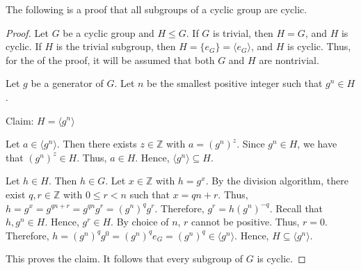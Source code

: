 \documentclass[12pt]{article}
\begin{document}
The following is a proof that all subgroups of a cyclic group are cyclic.

\begin{proof}
Let $G$ be a cyclic group and $H \le G$.  If $G$ is trivial, then $H=G$, and $H$ is cyclic.  If $H$ is the trivial subgroup, then $H=\{e_G\}=\langle e_G \rangle$, and $H$ is cyclic.  Thus, for the  of the proof, it will be assumed that both $G$ and $H$ are nontrivial.

Let $g$ be a generator of $G$.  Let $n$ be the smallest positive integer such that $g^n \in H$.

Claim:  $H=\langle g^n \rangle$

Let $a \in \langle g^n \rangle$.  Then there exists $z \in {\mathbb Z}$ with $a=(g^n)^z$.  Since $g^n \in H$, we have that $(g^n)^z \in H$.  Thus, $a \in H$.  Hence, $\langle g^n \rangle \subseteq H$.

Let $h \in H$.  Then $h \in G$.  Let $x \in {\mathbb Z}$ with $h=g^x$.  By the division algorithm, there exist $q,r \in {\mathbb Z}$ with $0 \le r<n$ such that $x=qn+r$.  Thus, $h=g^x=g^{qn+r}=g^{qn}g^r=(g^n)^qg^r$.  Therefore, $g^r=h(g^n)^{-q}$.  Recall that $h,g^n \in H$.  Hence, $g^r \in H$.  By choice of $n$, $r$ cannot be positive.  Thus, $r=0$.  Therefore, $h=(g^n)^qg^0=(g^n)^qe_G=(g^n)^q \in \langle g^n \rangle$.  Hence, $H \subseteq \langle g^n \rangle$.

This proves the claim.  It follows that every subgroup of $G$ is cyclic.
\end{proof}
\end{document}
